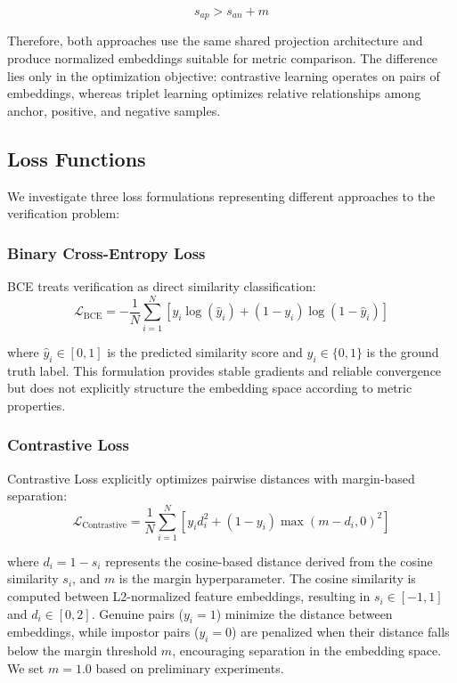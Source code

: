 \begin{equation}
s_{ap}>s_{an}+m
\end{equation}

Therefore, both approaches use the same shared projection architecture and produce normalized embeddings suitable for metric comparison. The difference lies only in the optimization objective: contrastive learning operates on pairs of embeddings, whereas triplet learning optimizes relative relationships among anchor, positive, and negative samples.

\subsection{Loss Functions}

We investigate three loss formulations representing different approaches to the verification problem:

\subsubsection{Binary Cross-Entropy Loss}

BCE treats verification as direct similarity classification:
\begin{equation}
\mathcal{L}_{\text{BCE}} = -\frac{1}{N}\sum_{i=1}^{N} \left[y_i \log(\hat{y}_i) + (1-y_i)\log(1-\hat{y}_i)\right]
\end{equation}

where $\hat{y}_i \in [0,1]$ is the predicted similarity score and $y_i \in \{0,1\}$ is the ground truth label. This formulation provides stable gradients and reliable convergence but does not explicitly structure the embedding space according to metric properties.

\subsubsection{Contrastive Loss}

Contrastive Loss explicitly optimizes pairwise distances with margin-based separation:
\begin{equation}
\mathcal{L}_{\text{Contrastive}} =
\frac{1}{N}\sum_{i=1}^{N}
\left[
y_i d_i^2 +
(1-y_i)\max(m-d_i,0)^2
\right]
\end{equation}

where $d_i = 1-s_i$ represents the cosine-based distance derived from the cosine similarity $s_i$, and $m$ is the margin hyperparameter. The cosine similarity is computed between L2-normalized feature embeddings, resulting in $s_i \in [-1,1]$ and $d_i \in [0,2]$. Genuine pairs ($y_i=1$) minimize the distance between embeddings, while impostor pairs ($y_i=0$) are penalized when their distance falls below the margin threshold $m$, encouraging separation in the embedding space. We set $m=1.0$ based on preliminary experiments.

